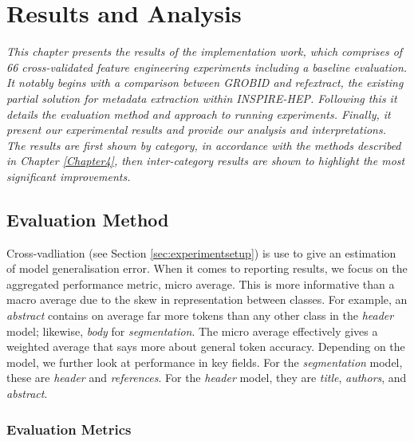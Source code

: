 
\chapter{Results and Analysis} %

\label{Chapter5} %


\emph{This chapter presents the results of the implementation work, which comprises of 66 cross-validated feature engineering experiments including a baseline evaluation. It notably begins with a comparison between GROBID and refextract, the existing partial solution for metadata extraction within INSPIRE-HEP. Following this it details the evaluation method and approach to running experiments. Finally, it present our experimental results and provide our analysis and interpretations. The results are first shown by category, in accordance with the methods described in Chapter \ref{Chapter4}, then inter-category results are shown to highlight the most significant improvements.}

\section{Evaluation Method}

Cross-vadliation (see Section \ref{sec:experimentsetup}) is use to give an estimation of model generalisation error. When it comes to reporting results, we focus on the aggregated performance metric, micro average. This is more informative than a macro average due to the skew in representation between classes. For example, an \emph{abstract} contains on average far more tokens than any other class in the \emph{header} model; likewise, \emph{body} for \emph{segmentation}. The micro average effectively gives a weighted average that says more about general token accuracy. Depending on the model, we further look at performance in key fields. For the \emph{segmentation} model, these are \emph{header} and \emph{references}. For the \emph{header} model, they are \emph{title}, \emph{authors}, and \emph{abstract}.

\subsection{Evaluation Metrics}
\label{subsec:evaluationmethod}

